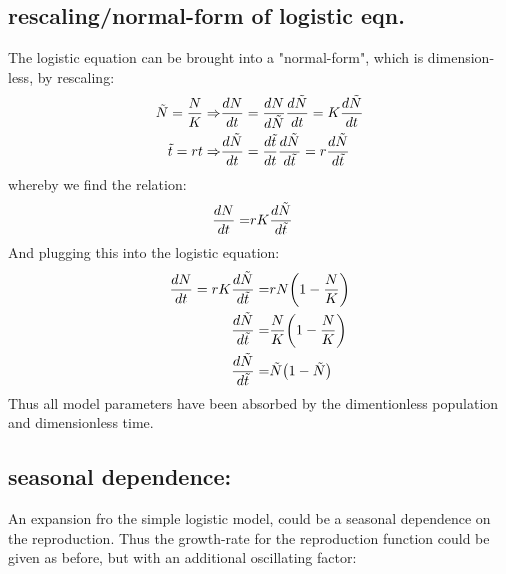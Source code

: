 \documentclass{article}
\begin{document}
\subsection{rescaling/normal-form of logistic eqn.}
The logistic equation can be brought into a "normal-form", which is dimension-less, by rescaling:
\begin{align*}
\tilde{N} = \frac{N}{K} \Rightarrow& \dv{N}{t} = \dv{N}{\tilde{N}} \dv{\tilde{N}}{t} = K \dv{\tilde{N}}{t} \\
\tilde{t} = r t \Rightarrow& \dv{\tilde{N}}{t} =  \dv{\tilde{t}}{t} \dv{\tilde{N}}{\tilde{t}} = r  \dv{\tilde{N}}{\tilde{t}}
\end{align*}
whereby we find the relation:
\begin{align*}
\dv{N}{t} =& r K \dv{\tilde{N}}{\tilde{t}} 
\end{align*}
And plugging this into the logistic equation:
\begin{align*}
\dv{N}{t} = r K \dv{\tilde{N}}{\tilde{t}} =& r N \qty(1 - \frac{N}{K}) \\
\dv{\tilde{N}}{\tilde{t}} =& \frac{N}{K} \qty(1 - \frac{N}{K}) \\
\dv{\tilde{N}}{\tilde{t}} =& \tilde{N} \qty(1 - \tilde{N})
\end{align*}
Thus all model parameters have been absorbed by the dimentionless population and dimensionless time.

\subsection{seasonal dependence:}
An expansion fro the simple logistic model, could be a seasonal dependence on the reproduction. 
Thus the growth-rate for the reproduction function could be given as before, but with an additional oscillating factor:
\begin{align*}
\end{align*}



\printbibliography
\end{document}
